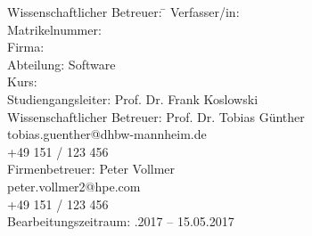 \begin{titlepage}
\begin{center}
\begin{minipage}{\textwidth}
\begin{tabbing}
	Wissenschaftlicher Betreuer: \hspace{0.85cm}\=\kill
	Verfasser/in: \> \DerAutorDerArbeit \\[1.5mm]
	Matrikelnummer:  \\[1.5mm]
	Firma: \> \DerNameDerFirma  \\[1.5mm]
	Abteilung: \> Software \\[1.5mm]
	Kurs: \> \DieKursbezeichnung \\[1.5mm]
	Studiengangsleiter: \> Prof. Dr. Frank Koslowski  \\[1.5mm]
	Wissenschaftlicher Betreuer: \> Prof. Dr. Tobias Günther\\
	\> tobias.guenther@dhbw-mannheim.de \\
	\> +49 151 / 123 456 \\[1.5mm]
	Firmenbetreuer: \> Peter Vollmer \\
	\> peter.vollmer2@hpe.com \\
	\> +49 151 / 123 456 \\[1.5mm]
	Bearbeitungszeitraum: .2017 -- 15.05.2017
\end{tabbing}
\end{minipage}

\end{center}

\end{titlepage}